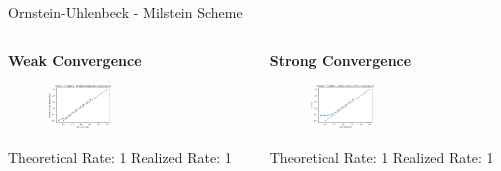 \documentclass[]{beamer}
\begin{document}
\begin{frame}{Ornstein-Uhlenbeck - Milstein Scheme}
  \begin{columns}
    \begin{column}{0.475\textwidth}
    \begin{center}
      \textbf{Weak Convergence}
    \end{center}
    \begin{figure}[t]
    \vspace{-1pt}
    \captionsetup[figure]{labelformat=empty}
    \includegraphics[width=0.4\textwidth]{ou_weak_milstein.png}
    \end{figure}
    Theoretical Rate: 1
    \newline
    Realized Rate: 1
    \end{column}

    \begin{column}{0.475\textwidth}
    \begin{center}
      \textbf{Strong Convergence}
    \end{center}
    \begin{figure}[t]
    \vspace{-1pt}
    \captionsetup[figure]{labelformat=empty}
    \includegraphics[width=0.4\textwidth]{ou_strong_milstein.png}
    \end{figure}
    Theoretical Rate: 1
    \newline
    Realized Rate: 1
    \end{column}
  \end{columns}
\end{frame}
\end{document}
